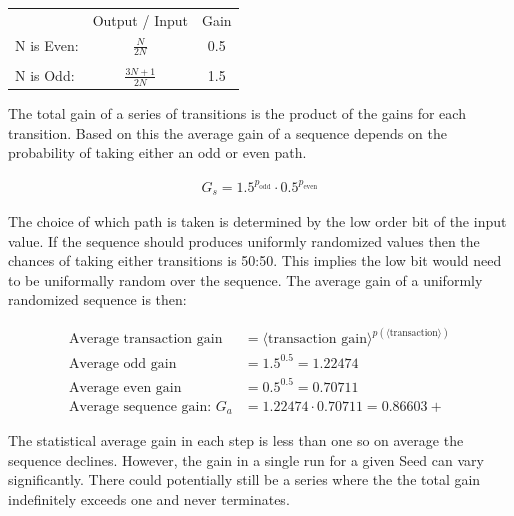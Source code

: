 \documentclass[letterpaper]{article}
\begin{document}
\begin{multicols}{2}
    \begin{center}
        \begin{tabular}{l c c}
                       & Output / Input      & Gain \\
            N is Even: & $\frac{N}{2N}$      & 0.5  \\
                       &                     &      \\
            N is Odd:  & $\frac{3N + 1}{2N}$ & 1.5
        \end{tabular}
    \end{center}

    The total gain of a series of transitions is the product of the gains for each transition. Based on this the average gain of a sequence depends on the probability of taking either an odd or even path.

    \begin{align*}
        G_s = 1.5^{p_{\text{odd}}} \cdot 0.5^{p_{\text{even}}}
    \end{align*}

    The choice of which path is taken is determined by the low order bit of the input value. If the sequence should produces uniformly randomized values then the chances of taking either transitions is 50:50. This implies the low bit would need to be uniformally random over the sequence. The average gain of a uniformly randomized sequence is then:

    \begin{align*}
        \text{Average transaction gain}         & = \langle \text{transaction gain} \rangle^{p(\langle \text{transaction} \rangle)} \\
        \text{Average odd gain}                 & = 1.5^{0.5} = 1.22474                                                             \\
        \text{Average even gain}                & = 0.5^{0.5} = 0.70711                                                             \\
        \text{Average sequence gain: } G_a & = 1.22474 \cdot 0.70711 = 0.86603+
    \end{align*}

    The statistical average gain in each step is less than one so on average the sequence declines. However, the gain in a single run for a given Seed can vary significantly. There could potentially still be a series where the the total gain indefinitely exceeds one and never terminates.


\end{multicols}
\end{document}
